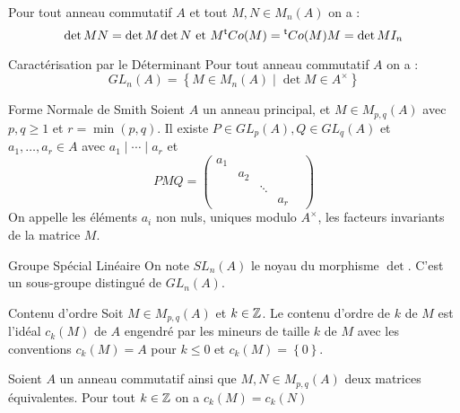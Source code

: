 \documentclass{cours}
\begin{document}
\begin{lemma}
    Pour tout anneau commutatif $A$ et tout $M, N \in M_{n}(A)$ on a :
    \[
        \det MN = \det M \det N \text{ et } M{^{\mathsf{t}}}Co(M) = {^{\mathsf{t}}}Co(M)M = \det M I_{n}
    \]
\end{lemma}

\begin{propositionfr}{Caractérisation par le Déterminant}{}
    Pour tout anneau commutatif $A$ on a :
    \[
        GL_{n}(A) = \left\{M \in M_{n}(A) \mid \det M \in A^{\times}\right\}
    \]
\end{propositionfr}

\begin{théorème}{Forme Normale de Smith}{}
    Soient $A$ un anneau principal, et $M \in M_{p, q}(A)$ avec $p,q \geq 1$ et $r = \min({p, q})$. Il existe $P \in GL_{p}(A), Q \in GL_{q}(A)$ et $a_{1}, \ldots, a_{r} \in A$ avec $a_{1}\mid \cdots \mid a_{r}$ et
    \[
        PMQ = \begin{pmatrix}
            a_{1} &       &        &       & \\
                  & a_{2} &        &       & \\
                  &       & \ddots &       & \\
                  &       &        & a_{r} &
        \end{pmatrix}
    \]
    On appelle les éléments $a_{i}$ non nuls, uniques modulo $A^{\times}$, les facteurs invariants de la matrice $M$.
\end{théorème}

\begin{définition}{Groupe Spécial Linéaire}{}
    On note $SL_{n}(A)$ le noyau du morphisme $\det$. C'est un sous-groupe distingué de $GL_{n}(A)$.
\end{définition}

\begin{définition}{Contenu d'ordre}{}
    Soit $M \in M_{p, q}(A)$ et $k \in \mathbb{Z}$. Le contenu d'ordre de $k$ de $M$ est l'idéal $c_{k}(M)$ de $A$ engendré par les mineurs de taille $k$ de $M$ avec les conventions $c_{k}(M) = A$ pour $k \leq 0$ et $c_{k}(M) = \left\{0\right\}$.
\end{définition}

\begin{lemma}
    Soient $A$ un anneau commutatif ainsi que $M, N \in M_{p, q}(A)$ deux matrices équivalentes. Pour tout $k \in \mathbb{Z}$ on a $c_{k}(M) = c_{k}(N)$
\end{lemma}
\end{document}
